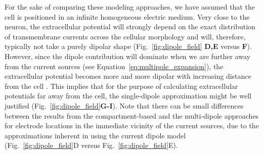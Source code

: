 \documentclass[preprint,10pt,authoryear]{elsarticle}
\newcommand{\hlb}[2][NavyBlue]{ {\sethlcolor{#1} \hl{#2}} }
\newcommand{\hlg}[2][Emerald]{ {\sethlcolor{#1} \hl{#2}} }
\newcommand{\snnote}[1]{\color{white}{\hlb{SN: #1 }}\color{black}}
\newcommand{\tvnnote}[1]{\color{white}{\hlg{TVN: #1 }}\color{black}}
\begin{document}
For the sake of comparing these modeling approaches, we have assumed that the cell is positioned in an infinite homogeneous electric medium. Very close to the neuron, the extracellular potential will strongly depend on the exact distribution of transmembrane currents across the cellular morphology and  will, therefore, typically not take a purely dipolar shape (Fig.~\ref{fig:dipole_field} \textbf{D,E} versus \textbf{F}). However, since the dipole contribution will dominate when we are further away from the current sources (see Equation~\ref{eq:multipole_expansion}), the extracellular potential becomes more and more dipolar with increasing distance from the cell \citep{LINDEN2010}. This implies that for the purpose of calculating extracellular potentials far away from the cell, the single-dipole approximation might be well justified (Fig.~\ref{fig:dipole_field}\textbf{G-I}). Note that there can be small differences between the results from the compartment-based and the multi-dipole approaches for electrode locations in the immediate vicinity of the current sources, due to the approximations inherent in using the current dipole model (Fig.~\ref{fig:dipole_field}D versus Fig.~\ref{fig:dipole_field}E).



	
\end{document}
